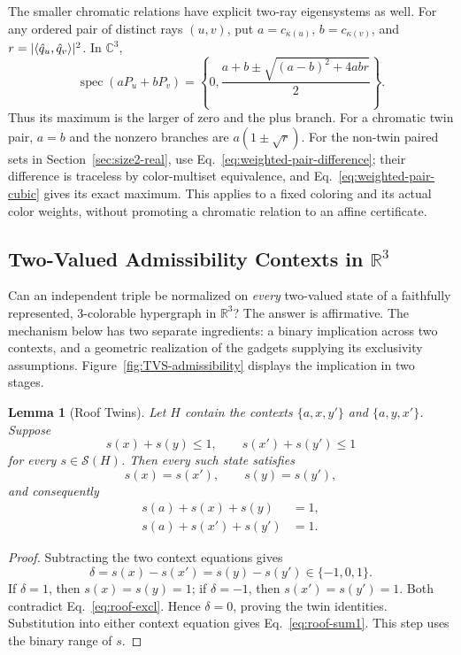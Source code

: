 \documentclass[aps,pra,reprint,superscriptaddress,longbibliography,nofootinbib,floatfix,10pt]{revtex4-2}
\newtheorem{lemma}[theorem]{Lemma}
\theoremstyle{definition}\newtheorem{definition}[theorem]{Definition}
\theoremstyle{remark}\newtheorem{remark}[theorem]{Remark}
\newcommand{\C}{\mathbb C}\newcommand{\R}{\mathbb R}\newcommand{\Q}{\mathbb Q}
\newcommand{\Sc}{\mathcal S}\newcommand{\Cc}{\mathcal C}\newcommand{\Wc}{\mathcal W}
\begin{document}
The smaller chromatic relations have explicit two-ray eigensystems as well. For any ordered pair of distinct rays $(u,v)$, put $a=c_{\kappa(u)}$, $b=c_{\kappa(v)}$, and $r=|\langle \hat q_u,\hat q_v\rangle|^2$. In $\C^3$,
\begin{equation}\label{eq:weighted-two-ray-spectrum}
\operatorname{spec}(aP_u+bP_v)
=\left\{0,\frac{a+b\pm\sqrt{(a-b)^2+4abr}}2\right\}.
\end{equation}
Thus its maximum is the larger of zero and the plus branch. For a chromatic twin pair, $a=b$ and the nonzero branches are $a(1\pm\sqrt r)$. For the non-twin paired sets in Section~\ref{sec:size2-real}, use Eq.~\eqref{eq:weighted-pair-difference}; their difference is traceless by color-multiset equivalence, and Eq.~\eqref{eq:weighted-pair-cubic} gives its exact maximum. This applies to a fixed coloring and its actual color weights, without promoting a chromatic relation to an affine certificate.

\subsection{Two-Valued Admissibility Contexts in \texorpdfstring{$\R^3$}{R3}}\label{sec:tvs-admissibility}

Can an independent triple be normalized on \emph{every} two-valued state of a faithfully represented, $3$-colorable hypergraph in $\R^3$? The answer is affirmative. The mechanism below has two separate ingredients: a binary implication across two contexts, and a geometric realization of the gadgets supplying its exclusivity assumptions. Figure~\ref{fig:TVS-admissibility} displays the implication in two stages.

\begin{lemma}[Roof Twins]\label{lem:roof-twin}
Let $H$ contain the contexts $\{a,x,y'\}$ and $\{a,y,x'\}$. Suppose
\begin{equation}\label{eq:roof-excl}
s(x)+s(y)\le1,\qquad s(x')+s(y')\le1
\end{equation}
for every $s\in\Sc(H)$. Then every such state satisfies
\begin{equation}\label{eq:roof-twins}
s(x)=s(x'),\qquad s(y)=s(y'),
\end{equation}
and consequently
\begin{equation}\label{eq:roof-sum1}
\begin{aligned}
s(a)+s(x)+s(y)&=1,\\
s(a)+s(x')+s(y')&=1.
\end{aligned}
\end{equation}
\end{lemma}
\begin{proof}
Subtracting the two context equations gives
\[
\delta=s(x)-s(x')=s(y)-s(y')\in\{-1,0,1\}.
\]
If $\delta=1$, then $s(x)=s(y)=1$; if $\delta=-1$, then $s(x')=s(y')=1$. Both contradict Eq.~\eqref{eq:roof-excl}. Hence $\delta=0$, proving the twin identities. Substitution into either context equation gives Eq.~\eqref{eq:roof-sum1}. This step uses the binary range of $s$.
\end{proof}
\end{document}
